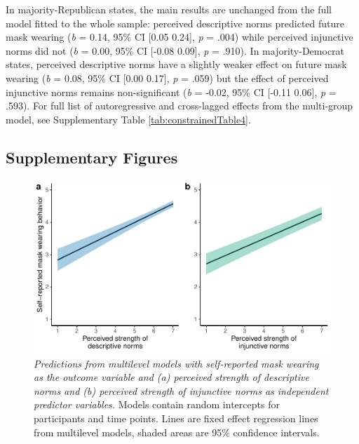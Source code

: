 \documentclass[
  man, donotrepeattitle,floatsintext]{apa6}
\begin{document}
In majority-Republican states, the main results are unchanged from the full model fitted to the whole sample: perceived descriptive norms predicted future mask wearing (\emph{b} = 0.14, 95\% CI {[}0.05 0.24{]}, \emph{p} = .004) while perceived injunctive norms did not (\emph{b} = 0.00, 95\% CI {[}-0.08 0.09{]}, \emph{p} = .910). In majority-Democrat states, perceived descriptive norms have a slightly weaker effect on future mask wearing (\emph{b} = 0.08, 95\% CI {[}0.00 0.17{]}, \emph{p} = .059) but the effect of perceived injunctive norms remains non-significant (\emph{b} = -0.02, 95\% CI {[}-0.11 0.06{]}, \emph{p} = .593). For full list of autoregressive and cross-lagged effects from the multi-group model, see Supplementary Table \ref{tab:constrainedTable4}.

\newpage

\hypertarget{supplementary-figures}{%
\subsection{Supplementary Figures}\label{supplementary-figures}}



\begin{figure}
\centering
\includegraphics{manuscript_files/figure-latex/plotCorBehNorm-1.pdf}
\caption{\label{fig:plotCorBehNorm}\emph{Predictions from multilevel models with self-reported mask wearing as the outcome variable and (a) perceived strength of descriptive norms and (b) perceived strength of injunctive norms as independent predictor variables.} Models contain random intercepts for participants and time points. Lines are fixed effect regression lines from multilevel models, shaded areas are 95\% confidence intervals.}
\end{figure}
\end{document}
